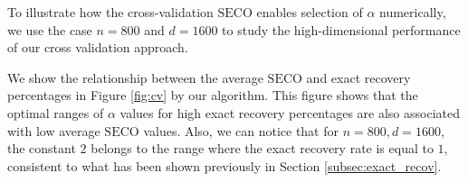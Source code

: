 \documentclass[11pt]{article}
\newcommand{\SECO}{\mathrm{SECO}}
\theoremstyle{definition}
\begin{document}
	To illustrate how the cross-validation $\SECO$ enables selection of $\alpha$ numerically, we use the case $n = 800$ and $d = 1600$ to study the high-dimensional performance of our cross validation approach. 
	
	We show the relationship between the average $\SECO$ and exact recovery percentages in Figure \ref{fig:cv} by our algorithm. This figure shows that the optimal ranges of $\alpha$ values for high exact recovery percentages are also associated with low average $\SECO$ values. Also, we can notice that for $n = 800, d = 1600$, the constant $2$ belongs to the range where the exact recovery rate is equal to $1$, consistent to what has been shown previously in Section \ref{subsec:exact_recov}.
	
	\begin{figure}[!htp]
    

\end{figure}
\end{document}
